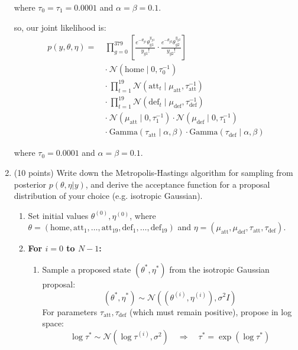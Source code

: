 \documentclass{article}
\begin{document}
\begin{enumerate}
    where $\tau_0 = \tau_1 = 0.0001$ and $\alpha = \beta = 0.1$.
    
   so, our joint likelihood is:
   \begin{align*}
    p(y, \theta, \eta) =\ & 
    \prod_{g=0}^{379} \left[ \frac{e^{-\theta_{g1}} \theta_{g1}^{y_{g1}}}{y_{g1}!} \cdot \frac{e^{-\theta_{g2}} \theta_{g2}^{y_{g2}}}{y_{g2}!} \right] \\
    & \cdot\ \mathcal{N}(\text{home} \mid 0, \tau_0^{-1}) \\
    & \cdot\ \prod_{t=1}^{19} \mathcal{N}(\text{att}_t \mid \mu_{\text{att}}, \tau_{\text{att}}^{-1}) \\
    & \cdot\ \prod_{t=1}^{19} \mathcal{N}(\text{def}_t \mid \mu_{\text{def}}, \tau_{\text{def}}^{-1}) \\
    & \cdot\ \mathcal{N}(\mu_{\text{att}} \mid 0, \tau_1^{-1}) \cdot \mathcal{N}(\mu_{\text{def}} \mid 0, \tau_1^{-1}) \\
    & \cdot\ \text{Gamma}(\tau_{\text{att}} \mid \alpha, \beta) \cdot \text{Gamma}(\tau_{\text{def}} \mid \alpha, \beta)
    \end{align*}
    
   where $\tau_0 = 0.0001$ and $\alpha = \beta = 0.1$.

\item (10 points) Write down the Metropolis-Hastings algorithm for sampling from posterior $p(\theta, \eta|y)$, and derive the acceptance function for a proposal distribution of your choice (e.g. isotropic Gaussian).

\begin{enumerate}
    \item {} Set initial values $\theta^{(0)}, \eta^{(0)}$, where $\theta = (\text{home}, \text{att}_1, \ldots, \text{att}_{19}, \text{def}_1, \ldots, \text{def}_{19})$ and $\eta = (\mu_{\text{att}}, \mu_{\text{def}}, \tau_{\text{att}}, \tau_{\text{def}})$.
    
    \item \textbf{For $i = 0$ to $N - 1$:}
    \begin{enumerate}
      \item {} Sample a proposed state $(\theta^*, \eta^*)$ from the isotropic Gaussian proposal:
      \[
      (\theta^*, \eta^*) \sim \mathcal{N}((\theta^{(i)}, \eta^{(i)}), \sigma^2 I)
      \]
      For parameters $\tau_{\text{att}}, \tau_{\text{def}}$ (which must remain positive), propose in log space:
      \[
      \log \tau^* \sim \mathcal{N}(\log \tau^{(i)}, \sigma^2) \quad \Rightarrow \quad \tau^* = \exp(\log \tau^*)
      \]
      

\end{enumerate}
\end{enumerate}
\end{enumerate}
\end{document}
